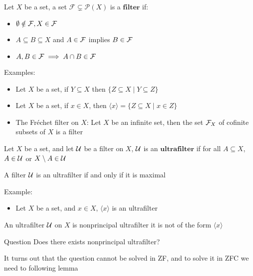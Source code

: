 	\begin{frame}
		\begin{definition}[filter]
			Let $X$ be a set, a set $\mathcal{F}\subsetneq\mathcal{P}(X)$ is a $\mathbf{filter}$ if:
			\begin{itemize}
				\item $\emptyset\notin \mathcal{F}, X\in\mathcal{F}$
				\item $A\subseteq B\subseteq X$ and $A\in\mathcal{F}$
				implies $B\in\mathcal{F}$
				\item $A,B\in\mathcal{F}\implies A\cap B\in\mathcal{F}$
			\end{itemize}
		\end{definition}
		Examples:\pause
		\begin{itemize}
			\item Let $X$ be a set, if $Y\subseteq X$ then $\{Z\subseteq X\mid Y\subseteq Z\}$\pause
			\item Let $X$ be a set, if $x\in X$, then $\langle x\rangle=\{Z\subseteq X\mid x\in Z\}$\pause
			\item The Fréchet filter on $X$: Let $X$ be an infinite set, then the set $\mathcal{F}_X$ of cofinite subsets of $X$ is a filter
		\end{itemize}
	\end{frame}
	\begin{frame}
		\begin{definition}[ultrafilter]
			Let $X$ be a set, and let $\mathcal{U}$ be a filter on $X$, $\mathcal{U}$ is an $\mathbf{ultrafilter}$ if for all $A\subseteq X$, $A\in\mathcal{U}$ or $X\setminus A\in\mathcal{U}$
		\end{definition}\pause
		\begin{lemma}
			A filter $\mathcal{U}$ is an ultrafilter if and only if it is maximal
		\end{lemma}\pause
		Example:
		\begin{itemize}
			\item Let $X$ be a set, and $x\in X$, $\langle x\rangle$ is an ultrafilter
		\end{itemize}\pause
		\begin{definition}
			An ultrafilter $\mathcal{U}$ on $X$ is nonprincipal ultrafilter it is not of the form $\langle x\rangle$
		\end{definition}\pause
		\begin{block}{Question}
			Does there exists nonprincipal ultrafilter?
		\end{block}\pause
		It turns out that the question cannot be solved in ZF, and to solve it in ZFC we need to following lemma
	\end{frame}
